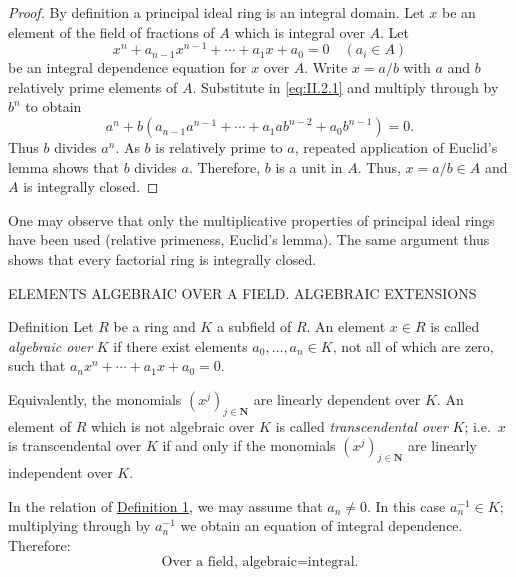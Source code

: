 \begin{proof}
By definition a principal ideal ring is an integral domain. Let $x$ be an
element of the field of fractions of $A$ which is integral over $A$. Let
\begin{equation}
x^{n}+a_{n-1}x^{n-1}+\cdots+a_{1}x+a_{0}=0\quad(a_{i}\in A)
\label{eq:II.2.1}
\end{equation}
be an integral dependence equation for $x$ over $A$. Write $x=a/b$ with $a$
and $b$ relatively prime elements of $A$. Substitute in \eqref{eq:II.2.1} and
multiply through by $b^{n}$ to obtain
\[
a^{n}+b\left(a_{n-1}a^{n-1}+\cdots+a_{1}ab^{n-2}+a_{0}b^{n-1}\right)=0.
\]
Thus $b$ divides $a^{n}$. As $b$ is relatively prime to $a$, repeated
application of Euclid's lemma shows that $b$ divides $a$. Therefore, $b$ is a
unit in $A$. Thus, $x=a/b\in A$ and $A$ is integrally closed.
\end{proof}

One may observe that only the multiplicative properties of principal ideal
rings have been used (relative primeness, Euclid's lemma). The same argument
thus shows that every factorial ring is integrally closed.

%
        {ELEMENTS ALGEBRAIC OVER A FIELD. ALGEBRAIC EXTENSIONS}

\begin{statement}{Definition}\label{def:II.3.1}
Let $R$ be a ring and $K$ a subfield of $R$. An element $x\in R$ is called
\emph{algebraic over} $K$ if there exist elements $a_{0},\ldots,a_{n}\in K$,
not all of which are zero, such that
$a_{n}x^{n}+\cdots+a_{1}x+a_{0}=0$.
\end{statement}

Equivalently, the monomials $(x^{j})_{j\in\mathbf{N}}$ are linearly
dependent over $K$. An element of $R$ which is not algebraic over $K$ is
called \emph{transcendental over} $K$; i.e.\ $x$ is transcendental over $K$
if and only if the monomials $(x^{j})_{j\in\mathbf{N}}$ are linearly
independent over $K$.

In the relation of \hyperref[def:II.3.1]{Definition 1}, we may assume that $a_{n}\neq0$. In this
case $a_{n}^{-1}\in K$; multiplying through by $a_{n}^{-1}$ we obtain an
equation of integral dependence. Therefore:
\begin{equation}
\text{Over a field, algebraic}=\text{integral.}
\label{eq:II.3.1}
\end{equation}

